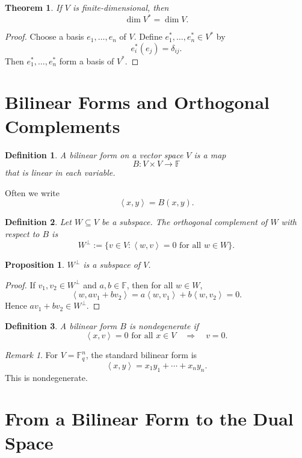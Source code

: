 \documentclass[11pt]{article}
\newtheorem{definition}{Definition}
\newtheorem{theorem}{Theorem}
\newtheorem{proposition}{Proposition}
\theoremstyle{remark}
\newtheorem{remark}{Remark}
\newcommand{\F}{\mathbb{F}}
\newcommand{\ip}[2]{\left\langle #1,#2\right\rangle}
\begin{document}
	\begin{theorem}
		If \(V\) is finite-dimensional, then
		\[
		\dim V^*=\dim V.
		\]
	\end{theorem}
	
	\begin{proof}
		Choose a basis \(e_1,\dots,e_n\) of \(V\). Define \(e_1^*,\dots,e_n^*\in V^*\) by
		\[
		e_i^*(e_j)=\delta_{ij}.
		\]
		Then \(e_1^*,\dots,e_n^*\) form a basis of \(V^*\).
	\end{proof}
	
	\section{Bilinear Forms and Orthogonal Complements}
	
	\begin{definition}
		A \emph{bilinear form} on a vector space \(V\) is a map
		\[
		B:V\times V\to \F
		\]
		that is linear in each variable.
	\end{definition}
	
	Often we write
	\[
	\ip{x}{y}=B(x,y).
	\]
	
	\begin{definition}
		Let \(W\subseteq V\) be a subspace. The \emph{orthogonal complement} of \(W\) with respect to \(B\) is
		\[
		W^\perp := \{v\in V:\ip{w}{v}=0 \text{ for all } w\in W\}.
		\]
	\end{definition}
	
	\begin{proposition}
		\(W^\perp\) is a subspace of \(V\).
	\end{proposition}
	
	\begin{proof}
		If \(v_1,v_2\in W^\perp\) and \(a,b\in\F\), then for all \(w\in W\),
		\[
		\ip{w}{av_1+bv_2}=a\ip{w}{v_1}+b\ip{w}{v_2}=0.
		\]
		Hence \(av_1+bv_2\in W^\perp\).
	\end{proof}
	
	\begin{definition}
		A bilinear form \(B\) is \emph{nondegenerate} if
		\[
		\ip{x}{v}=0 \text{ for all } x\in V
		\quad\Longrightarrow\quad
		v=0.
		\]
	\end{definition}
	
	\begin{remark}
		For \(V=\F_q^n\), the standard bilinear form is
		\[
		\ip{x}{y}=x_1y_1+\cdots+x_ny_n.
		\]
		This is nondegenerate.
	\end{remark}
	
	\section{From a Bilinear Form to the Dual Space}
	
\end{document}
